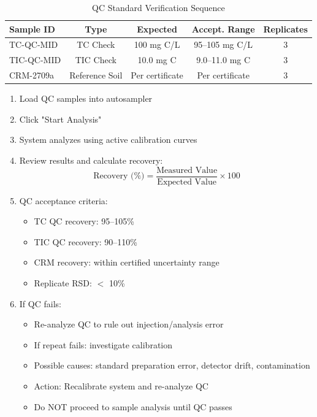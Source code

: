 \documentclass[11pt,a4paper]{article}\usepackage[]{graphicx}\usepackage[]{xcolor}
\begin{document}
\begin{table}[h]
\centering
\begin{tabular}{lcccc}
\toprule
\textbf{Sample ID} & \textbf{Type} & \textbf{Expected} & \textbf{Accept. Range} & \textbf{Replicates} \\
\midrule
TC-QC-MID & TC Check & 100 mg C/L & 95--105 mg C/L & 3 \\
TIC-QC-MID & TIC Check & 10.0 mg C & 9.0--11.0 mg C & 3 \\
CRM-2709a & Reference Soil & Per certificate & Per certificate & 3 \\
\bottomrule
\end{tabular}
\caption{QC Standard Verification Sequence}
\end{table}

\begin{enumerate}[noitemsep]
    \item Load QC samples into autosampler
    \item Click "Start Analysis"
    \item System analyzes using active calibration curves
    \item Review results and calculate recovery:
    \begin{equation}
    \text{Recovery (\%)} = \frac{\text{Measured Value}}{\text{Expected Value}} \times 100
    \end{equation}
    \item QC acceptance criteria:
    \begin{itemize}
        \item TC QC recovery: 95--105\%
        \item TIC QC recovery: 90--110\%
        \item CRM recovery: within certified uncertainty range
        \item Replicate RSD: $<$ 10\%
    \end{itemize}
    \item If QC fails:
    \begin{itemize}
        \item Re-analyze QC to rule out injection/analysis error
        \item If repeat fails: investigate calibration
        \item Possible causes: standard preparation error, detector drift, contamination
        \item Action: Recalibrate system and re-analyze QC
        \item Do NOT proceed to sample analysis until QC passes

\end{itemize}
\end{enumerate}
\end{document}
